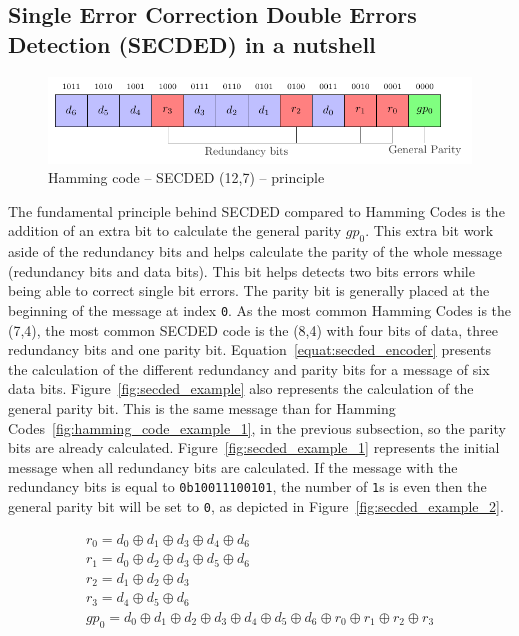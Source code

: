 \subsection{Single Error Correction Double Errors Detection (SECDED) in a nutshell}

\begin{figure}[ht]
    \centering
    \includegraphics[page=1]{c5_countermeasures_dift/img/secded.pdf}
    \caption{Hamming code -- SECDED (12,7) -- principle}
    \label{fig:secded_functionning}
\end{figure}

The fundamental principle behind SECDED compared to Hamming Codes is the addition of an extra bit to calculate the general parity $gp_0$. This extra bit work aside of the redundancy bits and helps calculate the parity of the whole message (redundancy bits and data bits). This bit helps detects two bits errors while being able to correct single bit errors. The parity bit is generally placed at the beginning of the message at index \texttt{0}. As the most common Hamming Codes is the (7,4), the most common SECDED code is the (8,4) with four bits of data, three redundancy bits and one parity bit.
Equation~\ref{equat:secded_encoder} presents the calculation of the different redundancy and parity bits for a message of six data bits.
Figure~\ref{fig:secded_example} also represents the calculation of the general parity bit. This is the same message than for Hamming Codes~\ref{fig:hamming_code_example_1}, in the previous subsection, so the parity bits are already calculated. Figure~\ref{fig:secded_example_1} represents the initial message when all redundancy bits are calculated. If the message with the redundancy bits is equal to \texttt{0b10011100101}, the number of \texttt{1}s is even then the general parity bit will be set to \texttt{0}, as depicted in Figure~\ref{fig:secded_example_2}.

\begin{equation} \label{equat:secded_encoder}
    \begin{split}
        r_{0}   = d_{0} \oplus d_{1} \oplus d_{3} \oplus d_{4} \oplus d_{6} \\
        r_{1}   = d_{0} \oplus d_{2} \oplus d_{3} \oplus d_{5} \oplus d_{6} \\
        r_{2}   = d_{1} \oplus d_{2} \oplus d_{3} \\
        r_{3}   = d_{4} \oplus d_{5} \oplus d_{6} \\
        gp_{0}  = d_{0} \oplus d_{1} \oplus d_{2} \oplus d_{3} \oplus d_{4} \oplus d_{5} \oplus d_{6} \oplus r_{0} \oplus r_{1} \oplus r_{2} \oplus r_{3}
    \end{split}
\end{equation}

